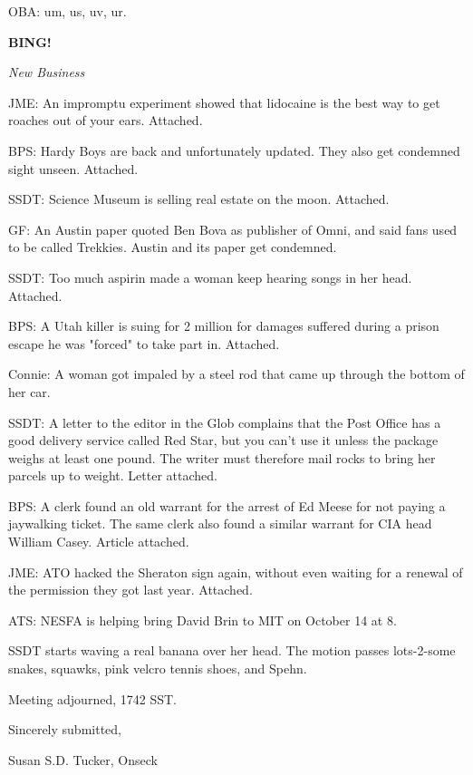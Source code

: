 \documentclass[12pt]{article}
\newcommand{\bing}{{\bf BING!} }
\newcommand{\goto}[1]{\bing \vskip 12pt \centerline{{\em{#1}}}}
\begin{document}
OBA: um, us, uv, ur.

\goto{New Business}

JME: An impromptu experiment showed that lidocaine is the best way to get roaches out of your ears. Attached.

BPS: Hardy Boys are back and unfortunately updated. They also get condemned sight unseen. Attached.

SSDT: Science Museum is selling real estate on the moon. Attached.

GF: An Austin paper quoted Ben Bova as publisher of Omni, and said fans used to be called Trekkies. Austin and its paper get condemned.

SSDT: Too much aspirin made a woman keep hearing songs in her head. Attached.

BPS: A Utah killer is suing for 2 million for damages suffered during a prison escape he was "forced" to take part in. Attached.

Connie: A woman got impaled by a steel rod that came up through the bottom of her car.

SSDT: A letter to the editor in the Glob complains that the Post Office has a good delivery service called Red Star, but you can't use it unless the package weighs at least one pound. The writer must therefore mail rocks to bring her parcels up to weight. Letter attached.

BPS: A clerk found an old warrant for the arrest of Ed Meese for not paying a jaywalking ticket. The same clerk also found a similar warrant for CIA head William Casey. Article attached.

JME: ATO hacked the Sheraton sign again, without even waiting for a renewal of the permission they got last year. Attached.

ATS: NESFA is helping bring David Brin to MIT on October 14 at 8.

SSDT starts waving a real banana over her head. The motion passes lots-2-some snakes, squawks, pink velcro tennis shoes, and Spehn.

\vspace{12pt}

\noindent
Meeting adjourned, 1742 SST.

\vspace{18pt}

\centerline{Sincerely submitted,}
\centerline{Susan S.D. Tucker, Onseck}
\end{document}

